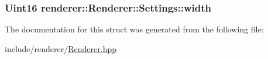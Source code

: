 \hypertarget{structrenderer_1_1Renderer_1_1Settings_afb912b8f8303be807da9c1cadd495a35}{
\subsubsection[{width}]{\setlength{\rightskip}{0pt plus 5cm}Uint16 renderer\-::\-Renderer\-::\-Settings\-::width}}\label{structrenderer_1_1Renderer_1_1Settings_afb912b8f8303be807da9c1cadd495a35}


The documentation for this struct was generated from the following file\-:\begin{DoxyCompactItemize}
\item 
include/renderer/\hyperlink{Renderer_8hpp}{Renderer.\-hpp}\end{DoxyCompactItemize}
